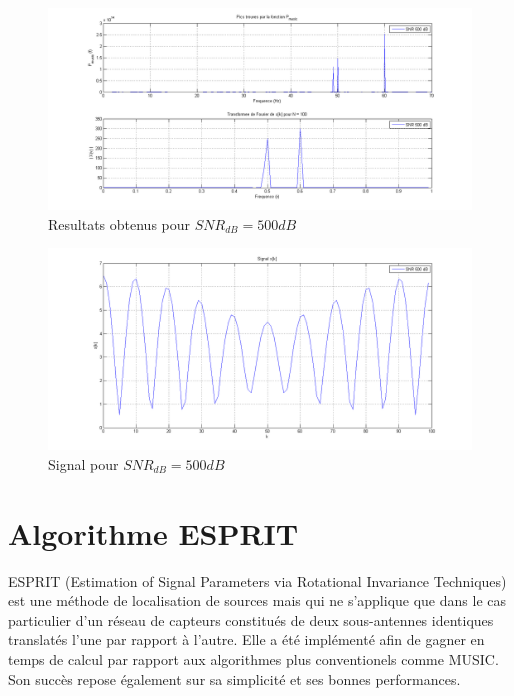 \documentclass{article}
\newcommand{\rapportFigure}{0.45}
\begin{document}
\FloatBarrier


\begin{figure}[h]
%
    \centering
    \includegraphics[scale=\rapportFigure ]{images/snr500}
    \caption{Resultats obtenus pour \(SNR_{dB} = 500 dB\)}
    \label{fig:snr500}
\end{figure}
%

\begin{figure}[h]
%
    \centering
    \includegraphics[scale=\rapportFigure ]{images/wave500}
    \caption{Signal pour \(SNR_{dB} = 500 dB\)}
    \label{fig:wave500}
\end{figure}
%

\newpage

\section{Algorithme ESPRIT}

ESPRIT (Estimation of Signal Parameters via Rotational Invariance Techniques) est une méthode de localisation de sources mais qui ne s'applique que dans le cas particulier d'un réseau de capteurs constitués de deux sous-antennes identiques translatés l'une par rapport à l'autre. Elle a été implémenté afin de gagner en temps de calcul par rapport aux algorithmes plus conventionels comme MUSIC. Son succès repose également sur sa simplicité et ses bonnes performances.
\end{document}
